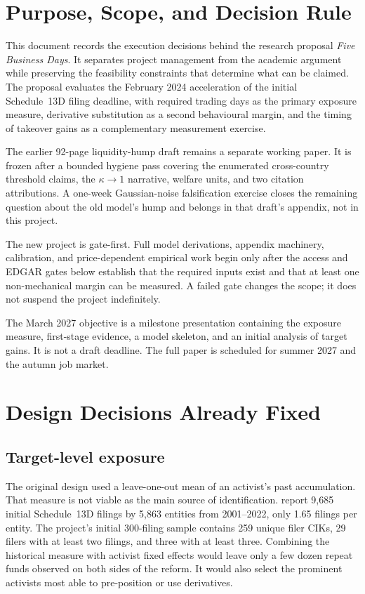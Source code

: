\section{Purpose, Scope, and Decision Rule}
\label{sec:plan-purpose}

This document records the execution decisions behind the research proposal
\emph{Five Business Days}. It separates project management from the academic
argument while preserving the feasibility constraints that determine what can
be claimed. The proposal evaluates the February 2024 acceleration of the
initial Schedule~13D filing deadline, with required trading days as the primary
exposure measure, derivative substitution as a second behavioural margin, and
the timing of takeover gains as a complementary measurement exercise.

The earlier 92-page liquidity-hump draft remains a separate working paper. It
is frozen after a bounded hygiene pass covering the enumerated cross-country
threshold claims, the $\kappa\to1$ narrative, welfare units, and two citation
attributions. A one-week Gaussian-noise falsification exercise closes the
remaining question about the old model's hump and belongs in that draft's
appendix, not in this project.

The new project is gate-first. Full model derivations, appendix machinery,
calibration, and price-dependent empirical work begin only after the access and
EDGAR gates below establish that the required inputs exist and that at least one
non-mechanical margin can be measured. A failed gate changes the scope; it does
not suspend the project indefinitely.

The March 2027 objective is a milestone presentation containing the exposure
measure, first-stage evidence, a model skeleton, and an initial analysis of
target gains. It is not a draft deadline. The full paper is scheduled for
summer 2027 and the autumn job market.

\section{Design Decisions Already Fixed}
\label{sec:plan-fixed}

\subsection{Target-level exposure}

The original design used a leave-one-out mean of an activist's past
accumulation. That measure is not viable as the main source of identification.
\textcite{polk2024} report 9{,}685 initial Schedule~13D filings by 5{,}863
entities from 2001--2022, only 1.65 filings per entity. The project's initial
300-filing sample contains 259 unique filer CIKs, 29 filers with at least two
filings, and three with at least three. Combining the historical measure with
activist fixed effects would leave only a few dozen repeat funds observed on
both sides of the reform. It would also select the prominent activists most
able to pre-position or use derivatives.

